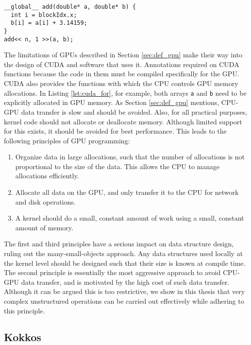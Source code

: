 \begin{lstlisting}[float,style=dan-style,caption=CUDA {\bf for} loop,label=lst:cuda_for]
__global__ add(double* a, double* b) {
  int i = blockIdx.x;
  b[i] = a[i] + 3.14159;
}
add<< n, 1 >>(a, b);
\end{lstlisting}

The limitations of GPUs described in Section \ref{sec:def_gpu} make their
way into the design of CUDA and software that uses it.
Annotations required on CUDA functions because the code in them
must be compiled specifically for the GPU.
CUDA also provides the functions with which the CPU controls GPU memory
allocations.
In Listing \ref{lst:cuda_for}, for example, both arrays {\tt a} and {\tt b}
need to be explicitly allocated in GPU memory.
As Section \ref{sec:def_gpu} mentions, CPU-GPU data transfer is slow and
should be avoided.
Also, for all practical purposes, kernel code should not allocate or
deallocate memory.
Although limited support for this exists, it should be avoided for best
performance.
This leads to the following principles of GPU programming:

\begin{enumerate}
\item Organize data in large allocations, such that the number of allocations
is not proportional to the size of the data. This allows the CPU to manage
allocations efficiently.
\item Allocate all data on the GPU, and only transfer it to the CPU
for network and disk operations.
\item A kernel should do a small, constant amount of work using a
small, constant amount of memory.
\end{enumerate}

The first and third principles have a serious impact on data structure
design, ruling out the many-small-objects approach.
Any data structures used locally at the kernel level should be designed such
that their size is known at compile time.
The second principle is essentially the most aggressive approach to avoid
CPU-GPU data transfer, and is motivated by the high cost of such data transfer.
Although it can be argued this is too restrictive,
we show in this thesis that very complex unstructured operations
can be carried out effectively while adhering to this principle.

\subsection{Kokkos}
\label{sec:kokkos}

